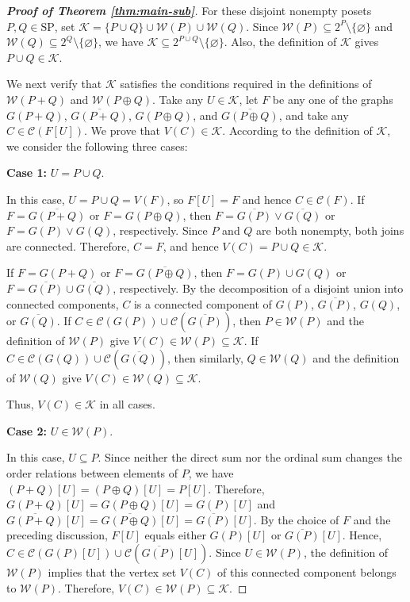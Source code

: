 \documentclass[10pt,a4paper]{amsart}
\begin{document}
\begin{proof}[\rm\textbf{Proof of Theorem \ref{thm:main-sub}}]
For these disjoint nonempty posets $P,Q\in\mathrm{SP}$,
set $\mathcal K=\{P\cup Q\}\cup\mathcal W(P)\cup\mathcal W(Q)$.
Since $\mathcal W(P)\subseteq 2^P\setminus\{\varnothing\}$
and $\mathcal W(Q)\subseteq 2^Q\setminus\{\varnothing\}$,
we have $\mathcal K\subseteq 2^{P\cup Q}\setminus\{\varnothing\}$.
Also, the definition of $\mathcal K$ gives $P\cup Q\in\mathcal K$.


We next verify that $\mathcal K$ satisfies the conditions
required in the definitions of $\mathcal W(P+Q)$ and $\mathcal W(P\oplus Q)$.
Take any $U\in\mathcal K$, let $F$ be any one of the graphs
$G(P+Q)$, $\overline{G(P+Q)}$, $G(P\oplus Q)$, and $\overline{G(P\oplus Q)}$,
and take any $C\in\mathcal C(F[U])$.
We prove that $V(C)\in\mathcal K$.
According to the definition of $\mathcal K$, we consider the following three cases:

\textbf{Case 1:} $U=P\cup Q$.

In this case, $U=P\cup Q=V(F)$, so $F[U]=F$ and hence $C\in\mathcal C(F)$.
If $F=\overline{G(P+Q)}$ or $F=G(P\oplus Q)$,
then $F=\overline{G(P)}\vee\overline{G(Q)}$ or $F=G(P)\vee G(Q)$, respectively.
Since $P$ and $Q$ are both nonempty, both joins are connected.
Therefore, $C=F$, and hence $V(C)=P\cup Q\in\mathcal K$.

If $F=G(P+Q)$ or $F=\overline{G(P\oplus Q)}$, then $F=G(P)\cup G(Q)$
or $F=\overline{G(P)}\cup\overline{G(Q)}$, respectively.
By the decomposition of a disjoint union into connected components,
$C$ is a connected component of $G(P)$, $\overline{G(P)}$, $G(Q)$, or $\overline{G(Q)}$.
If $C\in\mathcal C(G(P))\cup\mathcal C(\overline{G(P)})$,
then $P\in\mathcal W(P)$ and the definition of $\mathcal W(P)$
give $V(C)\in\mathcal W(P)\subseteq\mathcal K$.
If $C\in\mathcal C(G(Q))\cup\mathcal C(\overline{G(Q)})$,
then similarly, $Q\in\mathcal W(Q)$ and the definition of $\mathcal W(Q)$ give
$V(C)\in\mathcal W(Q)\subseteq\mathcal K$.

Thus, $V(C)\in\mathcal K$ in all cases.

\textbf{Case 2:} $U\in\mathcal W(P)$.

In this case, $U\subseteq P$.
Since neither the direct sum nor the ordinal sum changes
the order relations between elements of $P$,
we have $(P+Q)[U]=(P\oplus Q)[U]=P[U]$.
Therefore, $G(P+Q)[U]=G(P\oplus Q)[U]=G(P)[U]$ and
$\overline{G(P+Q)}[U]=\overline{G(P\oplus Q)}[U]=\overline{G(P)}[U]$.
By the choice of $F$ and the preceding discussion,
$F[U]$ equals either $G(P)[U]$ or $\overline{G(P)}[U]$.
Hence, $C\in\mathcal C(G(P)[U])\cup\mathcal C(\overline{G(P)}[U])$.
Since $U\in\mathcal W(P)$, the definition of $\mathcal W(P)$ implies that
the vertex set $V(C)$ of this connected component belongs to $\mathcal W(P)$.
Therefore, $V(C)\in\mathcal W(P)\subseteq\mathcal K$.


\end{proof}
\end{document}
